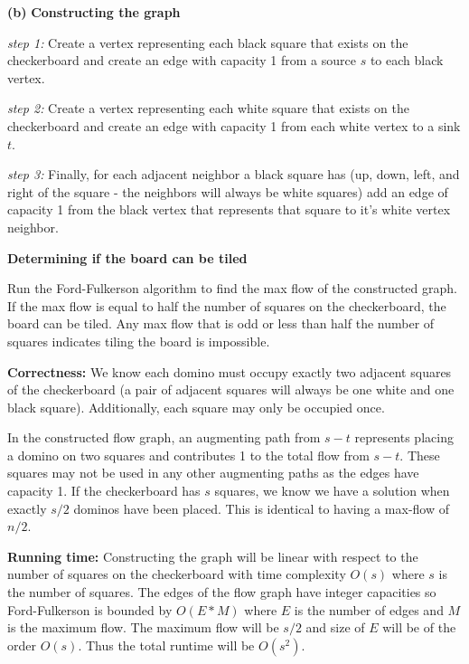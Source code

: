 \documentclass[11pt]{article}
\renewcommand\part[1]{\vspace{.10in}\textbf{(#1)}}
\newcommand\correctness{\vspace{.10in}\textbf{Correctness: }}
\newcommand\runtime{\vspace{.10in}\textbf{Running time: }}
\begin{document}

\part{b} \textbf{Constructing the graph} 

\textit{step 1:} Create a vertex representing each black square that exists on the checkerboard and create an edge with capacity 1 from a source $s$ to each black vertex.

\textit{step 2:} Create a vertex representing each white square that exists on the checkerboard and create an edge with capacity 1 from each white vertex to a sink $t$.

\textit{step 3:} Finally, for each adjacent neighbor a black square has (up, down, left, and right of the square - the neighbors will always be white squares) add an edge of capacity 1 from the black vertex that represents that square to it's white vertex neighbor.

\textbf{Determining if the board can be tiled} 

Run the Ford-Fulkerson algorithm to find the max flow of the constructed graph. If the max flow is equal to half the number of squares on the checkerboard, the board can be tiled. Any max flow that is odd or less than half the number of squares indicates tiling the board is impossible.

\correctness We know each domino must occupy exactly two adjacent squares of the checkerboard (a pair of adjacent squares will always be one white and one black square). Additionally, each square may only be occupied once.

	In the constructed flow graph, an augmenting path from $s-t$ represents placing a domino on two squares and contributes 1 to the total flow from $s-t$. These squares may not be used in any other augmenting paths as the edges have capacity 1. If the checkerboard has $s$ squares, we know we have a solution when exactly $s/2$ dominos have been placed. This is identical to having a max-flow of $n/2$.

\runtime Constructing the graph will be linear with respect to the number of squares on the checkerboard with time complexity $O(s)$ where $s$ is the number of squares. The edges of the flow graph have integer capacities so Ford-Fulkerson is bounded by $O(E * M)$ where $E$ is the number of edges and $M$ is the maximum flow. The maximum flow will be $s/2$ and size of $E$ will be of the order $O(s)$. Thus the total runtime will be $O(s^2)$.
\end{document}
